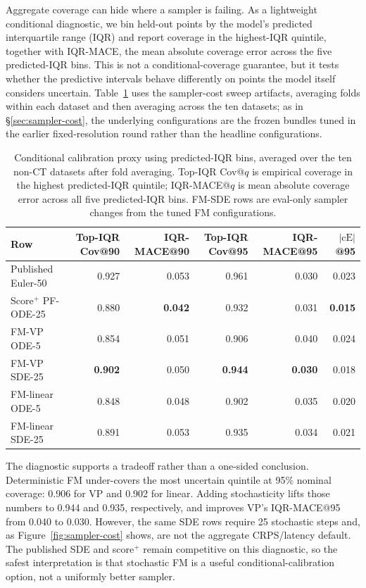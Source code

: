 \documentclass{article}
\begin{document}
Aggregate coverage can hide where a sampler is failing. As a lightweight conditional diagnostic, we bin held-out points by the model's predicted interquartile range (IQR) and report coverage in the highest-IQR quintile, together with IQR-MACE, the mean absolute coverage error across the five predicted-IQR bins. This is not a conditional-coverage guarantee, but it tests whether the predictive intervals behave differently on points the model itself considers uncertain. Table~\ref{tab:tail-diagnostic} uses the sampler-cost sweep artifacts, averaging folds within each dataset and then averaging across the ten datasets; as in \S\ref{sec:sampler-cost}, the underlying configurations are the frozen bundles tuned in the earlier fixed-resolution round rather than the headline configurations.

\begin{table}[!h]
  \centering
  \caption{Conditional calibration proxy using predicted-IQR bins, averaged over the ten non-CT datasets after fold averaging. Top-IQR Cov@$q$ is empirical coverage in the highest predicted-IQR quintile; IQR-MACE@$q$ is mean absolute coverage error across all five predicted-IQR bins. FM-SDE rows are eval-only sampler changes from the tuned FM configurations.}\label{tab:tail-diagnostic}
  \scriptsize
  \begin{tabular}{lrrrrr}
    \toprule
    Row & Top-IQR Cov@90 & IQR-MACE@90 & Top-IQR Cov@95 & IQR-MACE@95 & $|\text{cE}|$@95 \\
    \midrule
    Published Euler-50 & 0.927 & 0.053 & 0.961 & 0.030 & 0.023 \\
    Score$^+$ PF-ODE-25 & 0.880 & \textbf{0.042} & 0.932 & 0.031 & \textbf{0.015} \\
    FM-VP ODE-5 & 0.854 & 0.051 & 0.906 & 0.040 & 0.024 \\
    FM-VP SDE-25 & \textbf{0.902} & 0.050 & \textbf{0.944} & \textbf{0.030} & 0.018 \\
    FM-linear ODE-5 & 0.848 & 0.048 & 0.902 & 0.035 & 0.020 \\
    FM-linear SDE-25 & 0.891 & 0.053 & 0.935 & 0.034 & 0.021 \\
    \bottomrule
  \end{tabular}
\end{table}

The diagnostic supports a tradeoff rather than a one-sided conclusion. Deterministic FM under-covers the most uncertain quintile at 95\% nominal coverage: 0.906 for VP and 0.902 for linear. Adding stochasticity lifts those numbers to 0.944 and 0.935, respectively, and improves VP's IQR-MACE@95 from 0.040 to 0.030. However, the same SDE rows require 25 stochastic steps and, as Figure~\ref{fig:sampler-cost} shows, are not the aggregate CRPS/latency default. The published SDE and score$^+$ remain competitive on this diagnostic, so the safest interpretation is that stochastic FM is a useful conditional-calibration option, not a uniformly better sampler.
\end{document}
